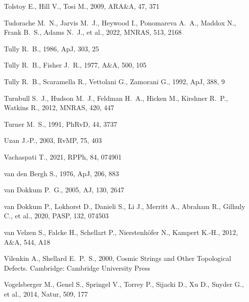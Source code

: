 \documentclass[fleqn,usenatbib]{mnras}
\begin{document}
\begin{thebibliography}{}
 Tolstoy E., Hill V., Tosi M., 2009, ARA\&A, 47, 371

 Tudorache M.~N., Jarvis M.~J., Heywood I., Ponomareva A.~A., Maddox N., Frank B.~S., Adams N.~J., et al., 2022, MNRAS, 513, 2168

 Tully R.~B., 1986, ApJ, 303, 25

 Tully R.~B., Fisher J.~R., 1977, A\&A, 500, 105

 Tully R.~B., Scaramella R., Vettolani G., Zamorani G., 1992, ApJ, 388, 9

 Turnbull S.~J., Hudson M.~J., Feldman H.~A., Hicken M., Kirshner R.~P., Watkins R., 2012, MNRAS, 420, 447

 Turner M.~S., 1991, PhRvD, 44, 3737

 Uzan J.-P., 2003, RvMP, 75, 403

 Vachaspati T., 2021, RPPh, 84, 074901

 van den Bergh S., 1976, ApJ, 206, 883

 van Dokkum P.~G., 2005, AJ, 130, 2647

 van Dokkum P., Lokhorst D., Danieli S., Li J., Merritt A., Abraham R., Gilhuly C., et al., 2020, PASP, 132, 074503

 van Velzen S., Falcke H., Schellart P., Nierstenh{\"o}fer N., Kampert K.-H., 2012, A\&A, 544, A18

 Vilenkin A., Shellard E.~P.~S., 2000, Cosmic Strings and Other Topological Defects. Cambridge: Cambridge University Press

 Vogelsberger M., Genel S., Springel V., Torrey P., Sijacki D., Xu D., Snyder G., et al., 2014, Natur, 509, 177


\end{thebibliography}
\end{document}
